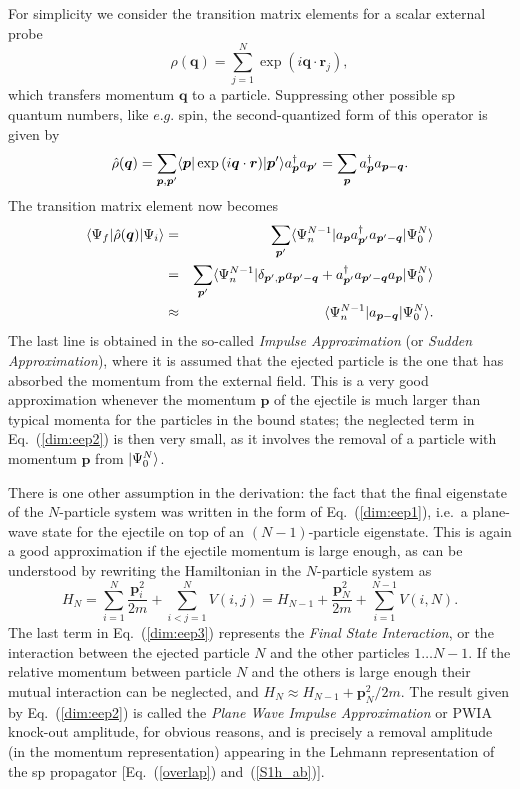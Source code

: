 For simplicity we consider the transition matrix elements for a scalar 
external probe 
\begin{equation}
\rho ({\bm q})=\sum_{j=1}^N \exp{(i{\bm q}\cdot{\bm r}_j)},
\label{eq:eep0}
\end{equation} 
which transfers momentum $\bm{q}$ to a particle.   
Suppressing other possible sp quantum numbers, like $\textit{e.g.}$ spin,
the second-quantized form of this operator is given by
\begin{equation} 
\hat{\rho}({\bm q}) = \sum_{\bm{p},\bm{p}'}\langle \bm{p} \vert\exp{(i{\bm q}
\cdot{\bm r})}\vert \bm{p}'\rangle a^{\dagger}_{\bm p}a_{\bm{p}'}
=\sum_{\bm p} a^{\dagger}_{\bm p} a_{{\bm p}-{\bm q}}.
\end{equation}
The transition matrix element now becomes 
\begin{eqnarray}
\langle \Psi_f  \vert\hat{\rho}({\bm q})\vert \Psi_i \rangle&=&
\sum_{\bm{p}'} \langle \Psi^{N-1}_{n} \vert a_{\bm{p}} a^{\dagger}_{\bm{p}'}
a_{\bm{p}'-\bm{q}}\vert \Psi^N_0\rangle
\nonumber \\
&=&
\sum_{\bm{p}'} \langle \Psi^{N-1}_{n} \vert\delta_{\bm{p}',\bm{p}}
a_{\bm{p}'-\bm{q}}
+a^{\dagger}_{\bm{p}'}a_{\bm{p}'-\bm{q}}a_{\bm p} \vert \Psi^N_0 \rangle
\nonumber\\ 
&\approx
&\langle \Psi^{N-1}_{n} \vert a_{{\bm p}-{\bm q}}\vert \Psi^N_0 \rangle .
\label{dim:eep2}
\end{eqnarray}
The last line is obtained in the so-called {\em Impulse Approximation} (or {\em Sudden Approximation}), 
where it is assumed that the ejected particle is the one that has absorbed 
the momentum from the external field. This is a very good approximation 
whenever the momentum ${\bm p}$ of the ejectile is much larger than typical 
momenta for the particles in the bound states; the neglected term in 
Eq.~(\ref{dim:eep2}) is then very small, as it involves the removal of a 
particle with momentum  ${\bm p}$ from $\vert \Psi^N_0\rangle$. 

There is one other assumption in 
the derivation: the fact that the final eigenstate of the $N$-particle system 
was written in the form of Eq.~(\ref{dim:eep1}), 
i.e.\ a plane-wave state for the ejectile on top of an $(N-1)$-particle 
eigenstate. This is again a good approximation 
if the ejectile momentum is large enough, as can be understood by rewriting 
the Hamiltonian in the $N$-particle system as 
\begin{equation} 
\label{dim:eep3}
H_N=\sum_{i=1}^N \frac{{\bm p}^2_i}{2m}+\sum_{i<j=1}^N V(i,j) 
=H_{N-1}+\frac{{\bm p}^2_N}{2m}+\sum_{i=1}^{N-1} V(i,N) .
\end{equation}
The last term in Eq.~(\ref{dim:eep3}) represents the 
{\em Final State Interaction}, or the 
interaction between the ejected particle $N$ and the other 
particles $1\dots N-1$. If the relative momentum between particle $N$ and the 
others is large enough their mutual interaction can be neglected, and 
$H_N \approx H_{N-1} + \bm{p}^2_N/2m$. 
The result given by Eq.~(\ref{dim:eep2}) is called the 
{\em Plane Wave Impulse Approximation} or 
PWIA knock-out amplitude, for obvious reasons, and is precisely 
a removal amplitude (in the momentum representation) appearing in the Lehmann
representation of the sp propagator [Eq.~(\ref{overlap}) and~(\ref{S1h_ab})].

